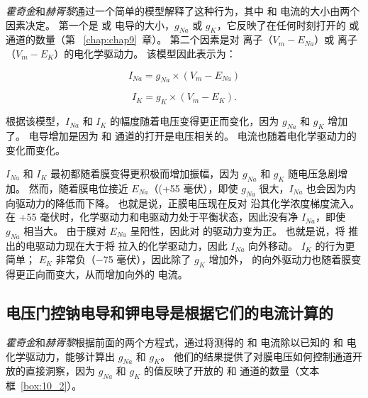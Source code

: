 \textit{霍奇金}和\textit{赫胥黎}通过一个简单的模型解释了这种行为，其中  和  电流的大小由两个因素决定。
第一个是  或  电导的大小，$g_{Na}$ 或 $g_K$，它反映了在任何时刻打开的  或  通道的数量（第 ~\ref{chap:chap9}~章）。
第二个因素是对  离子（$V_m − E_{Na}$）或  离子（$V_m − E_K$）的电化学驱动力。
该模型因此表示为：

\begin{equation}
	I_{Na} = g_{Na} \times (V_m - E_{Na})
\end{equation}

\begin{equation}
	I_K = g_K \times (V_m - E_K).
\end{equation}


根据该模型，$I_{Na}$ 和 $I_K$ 的幅度随着电压变得更正而变化，因为 $g_{Na}$ 和 $g_K$ 增加了。
电导增加是因为  和  通道的打开是电压相关的。
电流也随着电化学驱动力的变化而变化。


$I_{Na}$ 和 $I_K$ 最初都随着膜变得更积极而增加振幅，因为 $g_{Na}$ 和 $g_K$ 随电压急剧增加。
然而，随着膜电位接近 $E_{Na}$（(+55 毫伏），即使 $g_{Na}$ 很大，$I_{Na}$ 也会因为内向驱动力的降低而下降。
也就是说，正膜电压现在反对  沿其化学浓度梯度流入。
在 +55 毫伏时，化学驱动力和电驱动力处于平衡状态，因此没有净 $I_{Na}$，即使 $g_{Na}$ 相当大。
由于膜对 $E_{Na}$ 呈阳性，因此对  的驱动力变为正。 
也就是说，将  推出的电驱动力现在大于将  拉入的化学驱动力，因此 $I_{Na}$ 向外移动。
$I_K$ 的行为更简单；
$E_K$ 非常负（−75 毫伏），因此除了 $g_K$ 增加外， 的向外驱动力也随着膜变得更正向而变大，从而增加向外的  电流。



\subsection{电压门控钠电导和钾电导是根据它们的电流计算的}

\textit{霍奇金}和\textit{赫胥黎}根据前面的两个方程式，通过将测得的  和  电流除以已知的  和  电化学驱动力，能够计算出 $g_{Na}$ 和 $g_K$。
他们的结果提供了对膜电压如何控制通道开放的直接洞察，因为 $g_{Na}$ 和 $g_K$ 的值反映了开放的  和  通道的数量（文本框~\ref{box:10_2}）。


